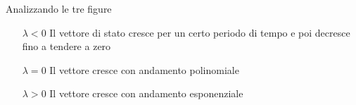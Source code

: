 Analizzando le tre figure
\begin{itemize}
 \item [$\lambda <0$] Il vettore di stato cresce per un certo periodo di tempo
e poi decresce fino a tendere a zero
 \item [$\lambda=0$] Il vettore cresce con andamento polinomiale
 \item [$\lambda>0$] Il vettore cresce con andamento esponenziale
\end{itemize}
